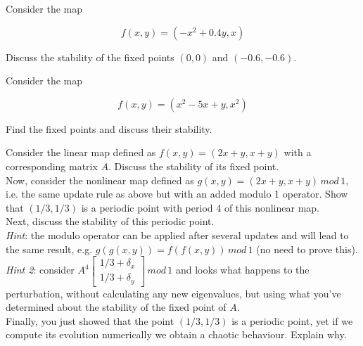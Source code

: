 \begin{sidebar}
\begin{ex}
Consider the map 

$$f(x,y) = (-x^2+0.4y, x)$$

Discuss the stability of the fixed points $(0,0)$ and $(-0.6,-0.6)$.

\end{ex}
\end{sidebar}

\begin{sidebar}
\begin{ex}
Consider the map 

$$f(x,y) = (x^2-5x+y, x^2)$$

Find the fixed points and discuss their stability.

\end{ex}
\end{sidebar}

\begin{sidebar}
\begin{ex}
Consider the linear map defined as $f(x,y) = (2x+y, x+y)$ with a corresponding matrix $A$. Discuss the stability of its fixed point.\\

Now, consider the nonlinear map defined as $g(x,y) = (2x+y, x+y)\, mod \, 1$, i.e. the same update rule as above but with an added modulo 1 operator. Show that $(1/3, 1/3)$ is a periodic point with period 4 of this nonlinear map.\\

Next, discuss the stability of this periodic point.\\

\textit{Hint}: the modulo operator can be applied after several updates and will lead to the same result, e.g.  $g(g(x,y)) = f(f(x,y)) \, mod \, 1$ (no need to prove this).\\
\textit{Hint 2}: consider $A^4 \begin{bmatrix} 1/3 + \delta_x \\ 1/3 + \delta_y \end{bmatrix} \, mod \, 1$ and looks what happens to the perturbation, without calculating any new eigenvalues, but using what you've determined about the stability of the fixed point of $A$.\\

Finally, you just showed that the point $(1/3, 1/3)$ is a periodic point, yet if we compute its evolution numerically we obtain a chaotic behaviour. Explain why.
\end{ex}
\end{sidebar}


